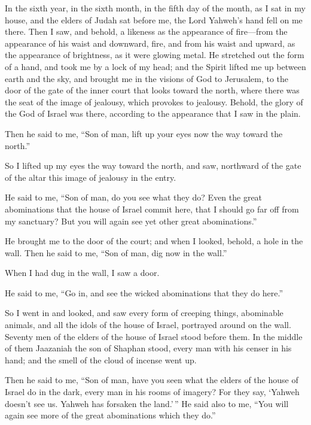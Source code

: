  In the sixth year, in the sixth month, in the fifth day
of the month, as I sat in my house, and the elders of Judah sat before
me, the Lord Yahweh's hand fell on me there.  Then I saw,
and behold, a likeness as the appearance of fire---from the appearance
of his waist and downward, fire, and from his waist and upward, as the
appearance of brightness, as it were glowing metal.  He
stretched out the form of a hand, and took me by a lock of my head; and
the Spirit lifted me up between earth and the sky, and brought me in the
visions of God to Jerusalem, to the door of the gate of the inner court
that looks toward the north, where there was the seat of the image of
jealousy, which provokes to jealousy.  Behold, the glory
of the God of Israel was there, according to the appearance that I saw
in the plain.

 Then he said to me, ``Son of man, lift up your eyes now
the way toward the north.''

So I lifted up my eyes the way toward the north, and saw, northward of
the gate of the altar this image of jealousy in the entry.

 He said to me, ``Son of man, do you see what they do?
Even the great abominations that the house of Israel commit here, that I
should go far off from my sanctuary? But you will again see yet other
great abominations.''

 He brought me to the door of the court; and when I
looked, behold, a hole in the wall.  Then he said to me,
``Son of man, dig now in the wall.''

When I had dug in the wall, I saw a door.

 He said to me, ``Go in, and see the wicked abominations
that they do here.''

 So I went in and looked, and saw every form of creeping
things, abominable animals, and all the idols of the house of Israel,
portrayed around on the wall.  Seventy men of the elders
of the house of Israel stood before them. In the middle of them
Jaazaniah the son of Shaphan stood, every man with his censer in his
hand; and the smell of the cloud of incense went up.

 Then he said to me, ``Son of man, have you seen what the
elders of the house of Israel do in the dark, every man in his rooms of
imagery? For they say, `Yahweh doesn't see us. Yahweh has forsaken the
land.'\,''  He said also to me, ``You will again see more
of the great abominations which they do.''

